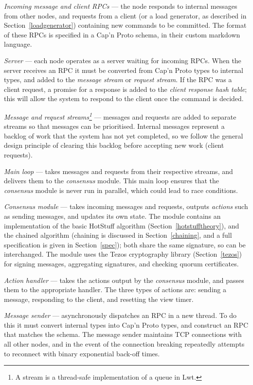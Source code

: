 \begin{description}
	\item \textit{Incoming message and client RPCs} --- the node responds to internal messages from other nodes, and requests from a client (or a load generator, as described in Section~\ref{loadgenerator}) containing new commands to be committed. The format of these RPCs is specified in a Cap'n Proto schema, in their custom markdown language.
	\item \textit{Server} --- each node operates as a server waiting for incoming RPCs. When the server receives an RPC it must be converted from Cap'n Proto types to internal types, and added to the \textit{message stream} or \textit{request stream}. If the RPC was a client request, a promise for a response is added to the \textit{client response hash table}; this will allow the system to respond to the client once the command is decided.
	\item \textit{Message and request streams\footnote{A stream is a thread-safe implementation of a queue in Lwt.}} --- messages and requests are added to separate streams so that messages can be prioritised. Internal messages represent a backlog of work that the system has not yet completed, so we follow the general design principle of clearing this backlog before accepting new work (client requests).
	\item \textit{Main loop} --- takes messages and requests from their respective streams, and delivers them to the \textit{consensus} module. This main loop ensures that the \textit{consensus} module is never run in parallel, which could lead to race conditions.
	\item \textit{Consensus module} --- takes incoming messages and requests, outputs \textit{actions} such as sending messages, and updates its own state. The module contains an implementation of the basic HotStuff algorithm (Section~\ref{hotstufftheory}), and the chained algorithm (chaining is discussed in Section~\ref{chaining}, and a full specification is given in Section~\ref{spec}); both share the same signature, so can be interchanged. The module uses the Tezos cryptography library (Section~\ref{tezos}) for signing messages, aggregating signatures, and checking quorum certificates.
	\item \textit{Action handler} --- takes the actions output by the \textit{consensus} module, and passes them to the appropriate handler. The three types of actions are: sending a message, responding to the client, and resetting the view timer.
	\item \textit{Message sender} --- asynchronously dispatches an RPC in a new thread. To do this it must convert internal types into Cap'n Proto types, and construct an RPC that matches the schema. The message sender maintains TCP connections with all other nodes, and in the event of the connection breaking repeatedly attempts to reconnect with binary exponential back-off times.

\end{description}
